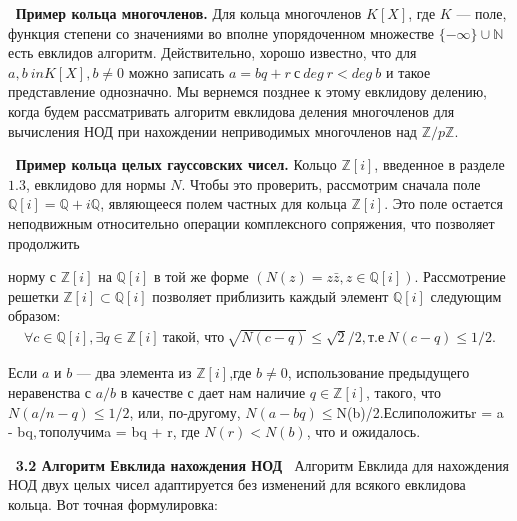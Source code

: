 \documentclass{../../template/mai_book}
\begin{document}
$\:$\newline
\noindent \textbf{Пример кольца многочленов.}
\newline \indent Для кольца многочленов $K[X]$, где $K$ — поле, функция степени со значениями во вполне упорядоченном множестве $\{-\infty\} \cup \mathds{N}$ есть евклидов алгоритм. Действительно, хорошо известно, что для $a,b \ in K[X], b \ne 0$ можно записать $a = bq + r\:с\:deg\:r < deg\:b$ и такое представление однозначно. Мы вернемся позднее к этому евклидову делению, когда будем рассматривать алгоритм евклидова деления многочленов для вычисления НОД при нахождении неприводимых многочленов над $\mathds{Z}/p\mathds{Z}$.

$\:$\newline
\noindent \textbf{Пример кольца целых гауссовских чисел.}
\newline \indent Кольцо $\mathds{Z}[i]$, введенное в разделе $1.3$, евклидово для нормы $N$. Чтобы это проверить, рассмотрим сначала поле $\mathds{Q}[i] = \mathds{Q} + i\mathds{Q}$, являющееся полем частных для кольца $\mathds{Z}[i]$. Это поле остается неподвижным относительно операции комплексного сопряжения, что позволяет продолжить

\newpage
\noindent норму с $\mathds{Z}[i]$ на $\mathds{Q}[i]$ в той же форме $(N(z) = z\bar{z}, z \in \mathds{Q}[i])$. Рассмотрение решетки $\mathds{Z}[i] \subset \mathds{Q}[i]$ позволяет приблизить каждый элемент $\mathds{Q}[i]$ следующим образом:
\begin{align*}
\forall c \in \mathds{Q}[i], \exists q \in \mathds{Z}[i]\:\text{такой, что}\: \sqrt{N(c-q)} \le \sqrt{2}/2,\text{т.е}\:N(c-q) \le 1/2\text{.}
\end{align*}

\noindent Если $a$ и $b$ — два элемента из $\mathds{Z}[i]$,где $b \ne 0$, использование предыдущего неравенства с $a/b$ в качестве с дает нам наличие $q \in \mathds{Z}[i]$, такого, что $N(a/n - q) \le 1/2$, или, по-другому, $N(a - bq) \le $N(b)/2$. Если положить $r = a - bq$, то получим $a = bq + r, где $N(r) < N(b)$, что и ожидалось.

$\:$ \newline
\textbf{\large 3.2 Алгоритм Евклида нахождения НОД}
$\:$ \newline
Алгоритм Евклида для нахождения НОД двух целых чисел адаптируется без изменений для всякого евклидова кольца. Вот точная формулировка:
\end{document}
